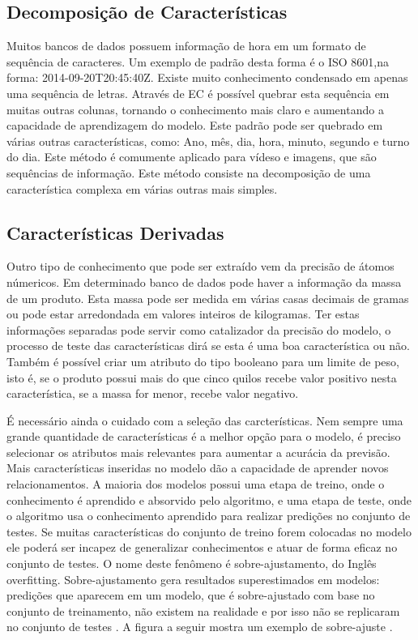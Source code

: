 \subsection{Decomposição de Características}
Muitos bancos de dados possuem informação de hora em um formato de sequência de caracteres. Um exemplo de padrão desta forma é o ISO 8601,na forma: 2014-09-20T20:45:40Z. Existe muito conhecimento condensado em apenas uma sequência de letras. Através de EC é possível quebrar esta sequência em muitas outras colunas, tornando o conhecimento mais claro e aumentando a capacidade de aprendizagem do modelo. Este padrão pode ser quebrado em várias outras características, como: Ano, mês, dia, hora, minuto, segundo e turno do dia. Este método é comumente aplicado para vídeso e imagens, que são sequências de informação. Este método consiste na decomposição de uma característica complexa em várias outras mais simples.


\subsection{Características Derivadas}
Outro tipo de conhecimento que pode ser extraído vem da precisão de átomos númericos. Em determinado banco de dados pode haver a informação da massa de um produto. Esta massa pode ser medida em várias casas decimais de gramas ou pode estar arredondada em valores inteiros de kilogramas. Ter estas informações separadas pode servir como catalizador da precisão do modelo, o processo de teste das características dirá se esta é uma boa característica ou não. Também é possível criar um atributo do tipo booleano para um limite de peso, isto é, se o produto possui mais do que cinco quilos recebe valor positivo nesta característica, se a massa for menor, recebe valor negativo.

É necessário ainda o cuidado com a seleção das carcterísticas. Nem sempre uma grande quantidade de características é a melhor opção para o modelo, é  preciso selecionar os atributos mais relevantes para aumentar a acurácia da previsão. Mais características inseridas no modelo dão a capacidade de aprender novos relacionamentos. A maioria dos modelos possui uma etapa de treino, onde o conhecimento é aprendido e absorvido pelo algoritmo, e uma etapa de teste, onde o algoritmo usa o conhecimento aprendido para realizar predições no conjunto de testes. Se muitas características do conjunto de treino forem colocadas no modelo ele poderá ser incapez de generalizar conhecimentos e atuar de forma eficaz no conjunto de testes. O nome deste fenômeno é sobre-ajustamento, do Inglês overfitting. Sobre-ajustamento gera resultados superestimados em modelos: predições que aparecem em um modelo, que é sobre-ajustado com base no conjunto de treinamento, não existem na realidade e por isso não se replicaram no conjunto de testes \cite{what2013}. A figura a seguir mostra um exemplo de sobre-ajuste \cite{real2013}.


